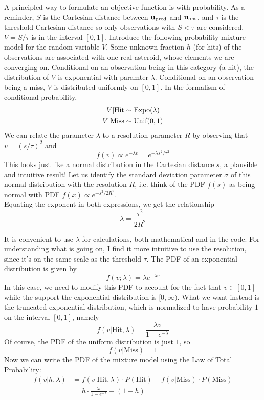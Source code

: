 A principled way to formulate an objective function is with probability.
As a reminder, $S$ is the Cartesian distance between $\mathbf{u}_{\mathrm{pred}}$ and $\mathbf{u}_{\mathrm{obs}}$,
and $\tau$ is the threshold Cartesian distance so only observations with $S < \tau$ are considered.
$V = S / \tau$ is in the interval $[0, 1]$.
Introduce the following probability mixture model for the random variable $V$.
Some unknown fraction $h$ (for hits) of the observations are associated with one real asteroid, whose elements we are converging on.
Conditional on an observation being in this category (a hit), the distribution of $V$ is exponential with paramter $\lambda$.
Conditional on an observation being a miss, $V$ is distributed uniformly on $[0,1]$.
In the formalism of conditional probability,
\begin{align*}
V | \textrm{Hit} &\sim \textnormal{Expo}(\lambda) \\
V | \textrm{Miss} &\sim \textnormal{Unif}(0,1)
\end{align*}
We can relate the parameter $\lambda$ to a resolution parameter $R$ by observing that $v=(s/\tau)^2$ and
$$f(v) \propto e^{-\lambda v} = e^{-\lambda s^2 / \tau^2}$$
This looks just like a normal distribution in the Cartesian distance $s$, a plausible and intuitive result!
Let us identify the standard deviation parameter $\sigma$ of this normal distribution with the resolution $R$,
i.e. think of the PDF $f(s)$ as being normal with PDF $f(x) \propto e^{-s^2 / 2 R^2}$.\\
Equating the exponent in both expressions, we get the relationship
$$ \lambda = \frac{\tau^2}{2R^2}$$

It is convenient to use $\lambda$ for calculations, both mathematical and in the code.
For understanding what is going on, I find it more intuitive to use the resolution, since it's on the same scale as the threshold $\tau$.
The PDF of an exponential distribution is given by \cite{BH}
$$ f(v; \lambda) =\lambda e^{-\lambda v}$$
In this case, we need to modify this PDF to account for the fact that $v \in [0,1]$ 
while the support the exponential distribution is $[0, \infty)$.
What we want instead is the truncated exponential distribution, which is normalized to have probability $1$ on the interval $[0,1]$, namely
$$ f(v| \mathrm{Hit}, \lambda) = \frac{\lambda v}{1 - e^{-\lambda}}$$
Of course, the PDF of the uniform distribution is just $1$, so
$$ f(v | \mathrm{Miss}) = 1$$
Now we can write the PDF of the mixture model using the Law of Total Probability:
\begin{align*}
f(v| h, \lambda) &= f(v|\mathrm{Hit}, \lambda) \cdot P(\mathrm{Hit}) + f(v|\mathrm{Miss}) \cdot P(\mathrm{Miss}) \\
&= h \cdot \frac{\lambda v}{1 - e^{-\lambda}} + (1 - h)
\end{align*}

